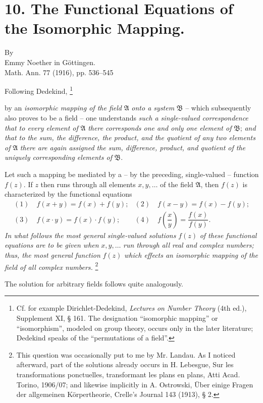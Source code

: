 \documentclass[11pt]{article}
\providecommand{\Afield}{\mathfrak A}
\providecommand{\Bfield}{\mathfrak B}
\providecommand{\srcfn}[2]{%
  \begingroup
  \renewcommand{\thefootnote}{#1}%
  \footnote{#2}%
  \addtocounter{footnote}{-1}%
  \endgroup}
\begin{document}
\section*{10. The Functional Equations of the Isomorphic Mapping.}
\begin{center}
By\\[0.25em]
Emmy Noether in Göttingen.\\[0.6em]
Math. Ann. 77 (1916), pp. 536--545
\end{center}

Following Dedekind,\srcfn{*)}{Cf. for example Dirichlet-Dedekind, \emph{Lectures on Number Theory} (4th ed.), Supplement XI, § 161. The designation ``isomorphic mapping'' or ``isomorphism'', modeled on group theory, occurs only in the later literature; Dedekind speaks of the ``permutations of a field''.} by an \emph{isomorphic mapping of the field} \(\Afield\) \emph{onto a system} \(\Bfield\) -- which subsequently also proves to be a field -- one understands \emph{such a single-valued correspondence that to every element of} \(\Afield\) \emph{there corresponds one and only one element of} \(\Bfield\); \emph{and that to the sum, the difference, the product, and the quotient of any two elements of} \(\Afield\) \emph{there are again assigned the sum, difference, product, and quotient of the uniquely corresponding elements of} \(\Bfield\).

Let such a mapping be mediated by a -- by the preceding, single-valued -- function \(f(z)\). If \(z\) then runs through all elements \(x,y,\ldots\) of the field \(\Afield\), then \(f(z)\) is characterized by the functional equations
\[
\begin{array}{ll}
(1)\quad f(x+y)=f(x)+f(y); & (2)\quad f(x-y)=f(x)-f(y);\\[0.45em]
(3)\quad f(x\cdot y)=f(x)\cdot f(y); & (4)\quad f\!\left(\dfrac{x}{y}\right)=\dfrac{f(x)}{f(y)}.
\end{array}
\]
\emph{In what follows the most general single-valued solutions} \(f(z)\) \emph{of these functional equations are to be given when} \(x,y,\ldots\) \emph{run through all real and complex numbers; thus, the most general function} \(f(z)\) \emph{which effects an isomorphic mapping of the field of all complex numbers.}\srcfn{**)}{This question was occasionally put to me by Mr. Landau. As I noticed afterward, part of the solutions already occurs in H. Lebesgue, Sur les transformations ponctuelles, transformant les plans en plans, Atti Acad. Torino, 1906/07; and likewise implicitly in A. Ostrowski, Über einige Fragen der allgemeinen Körpertheorie, Crelle's Journal 143 (1913), § 2.} The solution for arbitrary fields follows quite analogously.
\end{document}
